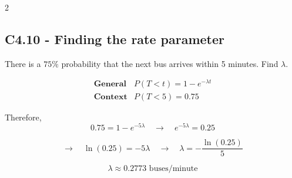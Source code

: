 \begin{multicols}{2}
\subsection*{C4.10 - Finding the rate parameter}
\label{subsec:c4-find-rate-bus}

There is a $75\%$ probability that the next bus arrives within
5 minutes. Find $\lambda$.

\[
\begin{array}{c|c}
	\textbf{General} & P(T<t)=1-e^{-\lambda t}\\[6pt]
	\textbf{Context} & P(T<5)=0.75
\end{array}
\]

Therefore,
\[
0.75=1-e^{-5\lambda}
\quad\longrightarrow\quad
e^{-5\lambda}=0.25
\]

\[
\longrightarrow\quad
\ln(0.25)=-5\lambda
\quad\longrightarrow\quad
\lambda=-\frac{\ln(0.25)}{5}
\]

\[
\boxed{\lambda\approx0.2773\text{ buses/minute}}
\]

\end{multicols}

